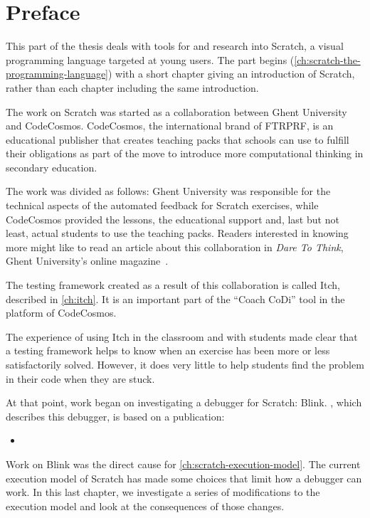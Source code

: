 \documentclass[./main]{subfiles}
\begin{document}
\chapter*{Preface}

This part of the thesis deals with tools for and research into Scratch, a visual programming language targeted at young users.
The part begins (\cref{ch:scratch-the-programming-language}) with a short chapter giving an introduction of Scratch, rather than each chapter including the same introduction.

The work on Scratch was started as a collaboration between Ghent University and CodeCosmos.
CodeCosmos, the international brand of FTRPRF, is an educational publisher that creates teaching packs that schools can use to fulfill their obligations as part of the move to introduce more computational thinking in secondary education.

The work was divided as follows: Ghent University was responsible for the technical aspects of the automated feedback for Scratch exercises, while CodeCosmos provided the lessons, the educational support and, last but not least, actual students to use the teaching packs.
Readers interested in knowing more might like to read an article about this collaboration in \textit{Dare To Think}, Ghent University's online magazine~\autocite{daretothinkCoachCoDiMotivationboosting2023}.

The testing framework created as a result of this collaboration is called Itch, described in \cref{ch:itch}.
It is an important part of the ``Coach CoDi'' tool in the platform of CodeCosmos.

The experience of using Itch in the classroom and with students made clear that a testing framework helps to know when an exercise has been more or less satisfactorily solved.
However, it does very little to help students find the problem in their code when they are stuck.

At that point, work began on investigating a debugger for Scratch: Blink.
, which describes this debugger, is based on a publication:

\begin{itemize}
    \item {}
\end{itemize}

Work on Blink was the direct cause for \cref{ch:scratch-execution-model}.
The current execution model of Scratch has made some choices that limit how a debugger can work.
In this last chapter, we investigate a series of modifications to the execution model and look at the consequences of those changes.
\end{document}
